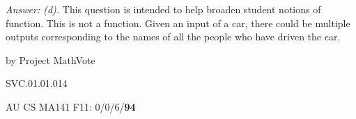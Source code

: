 {\it Answer: (d).}  This question is intended to help broaden student notions of function.  This is not a function.  Given an input of a car, there could be multiple outputs corresponding to the names of all the people who have driven the car.

\medskip
by Project MathVote

SVC.01.01.014

AU CS MA141 F11: 0/0/6/{\bf 94}  \\
